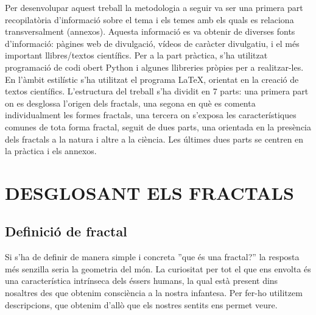 \documentclass[12pt,a4paper]{report}
\begin{document}
Per desenvolupar aquest treball la metodologia a seguir va ser una primera part recopilatòria d’informació sobre el tema i els temes amb els quals es relaciona transversalment (annexos). Aquesta informació es va obtenir de diverses fonts d’informació: pàgines web de divulgació, vídeos de caràcter divulgatiu, i el més important llibres/textos científics. Per a la part pràctica, s’ha utilitzat programació de codi obert Python i algunes llibreries pròpies per a realitzar-les. En l'àmbit estilístic s’ha utilitzat el programa \LaTeX, orientat en la creació de textos científics. L’estructura del treball s’ha dividit en 7 parts: una primera part on es desglossa l'origen dels fractals, una segona en què es comenta individualment les formes fractals, una tercera on s’exposa les característiques comunes de tota forma fractal, seguit de dues parts, una orientada en la presència dels fractals a la natura i altre a la ciència. Les últimes dues parts se centren en la pràctica i els annexos.


%
%
\chapter{DESGLOSANT ELS FRACTALS}
\section{Definició de fractal}
Si s'ha de definir de manera simple i concreta ''que és una fractal?'' la resposta més senzilla seria la geometria del món. La curiositat per tot el que ens envolta és una característica intrínseca dels éssers humans, la qual està present dins nosaltres des que obtenim consciència a la nostra infantesa. Per fer-ho utilitzem descripcions, que obtenim d'allò que els nostres sentits ens permet veure.
\end{document}
